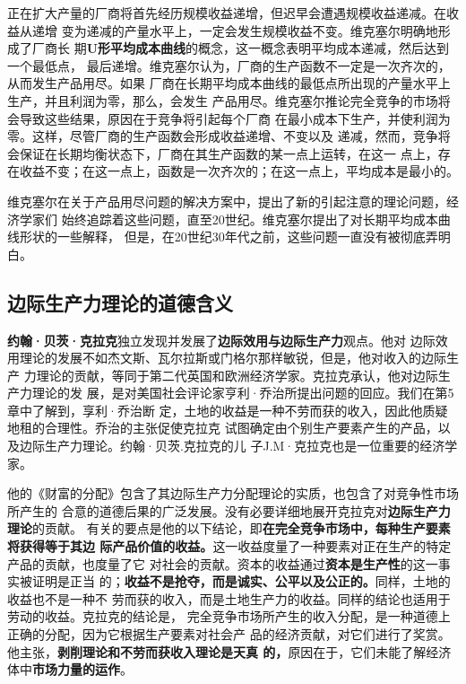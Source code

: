 正在扩大产量的厂商将首先经历规模收益递增，但迟早会遭遇规模收益递减。在收益从递增
变为递减的产量水平上，一定会发生规模收益不变。维克塞尔明确地形成了厂商长
期\textbf{U形平均成本曲线}的概念，这一概念表明平均成本递减，然后达到一个最低点，
最后递增。维克塞尔认为，厂商的生产函数不一定是一次齐次的，从而发生产品用尽。如果
厂商在长期平均成本曲线的最低点所出现的产量水平上生产，并且利润为零，那么，会发生
产品用尽。维克塞尔推论完全竞争的市场将会导致这些结果，原因在于竞争将引起每个厂商
在最小成本下生产，并使利润为零。这样，尽管厂商的生产函数会形成收益递增、不变以及
递减，然而，竞争将会保证在长期均衡状态下，厂商在其生产函数的某一点上运转，在这一
点上，存在收益不变；在这一点上，函数是一次齐次的；在这一点上，平均成本是最小的。

维克塞尔在关于产品用尽问题的解决方案中，提出了新的引起注意的理论问题，经济学家们
始终追踪着这些问题，直至20世纪。维克塞尔提出了对长期平均成本曲线形状的一些解释，
但是，在20世纪30年代之前，这些问题一直没有被彻底弄明白。

\subsection{边际生产力理论的道德含义}

\textbf{约翰·贝茨·克拉克}独立发现并发展了\textbf{边际效用与边际生产力}观点。他对
边际效用理论的发展不如杰文斯、瓦尔拉斯或门格尔那样敏锐，但是，他对收入的边际生产
力理论的贡献，等同于第二代英国和欧洲经济学家。克拉克承认，他对边际生产力理论的发
展，是对美国社会评论家亨利·乔治所提出问题的回应。我们在第5章中了解到，享利·乔治断
定，土地的收益是一种不劳而获的收入，因此他质疑地租的合理性。乔治的主张促使克拉克
试图确定由个别生产要素产生的产品，以及边际生产力理论。约翰·贝茨.克拉克的儿
子J.M·克拉克也是一位重要的经济学家。

他的《财富的分配》包含了其边际生产力分配理论的实质，也包含了对竞争性市场所产生的
合意的道德后果的广泛发展。没有必要详细地展开克拉克对\textbf{边际生产力理论}的贡献。
有关的要点是他的以下结论，即\textbf{在完全竞争市场中，每种生产要素将获得等于其边
  际产品价值的收益。}这一收益度量了一种要素对正在生产的特定产品的贡献，也度量了它
对社会的贡献。资本的收益通过\textbf{资本是生产性}的这一事实被证明是正当
的；\textbf{收益不是抢夺，而是诚实、公平以及公正的。}同样，土地的收益也不是一种不
劳而获的收入，而是土地生产力的收益。同样的结论也适用于劳动的收益。克拉克的结论是，
完全竞争市场所产生的收入分配，是一种道德上正确的分配，因为它根据生产要素对社会产
品的经济贡献，对它们进行了奖赏。他主张，\textbf{剥削理论和不劳而获收入理论是天真
  的，}原因在于，它们未能了解经济体中\textbf{市场力量的运作}。

